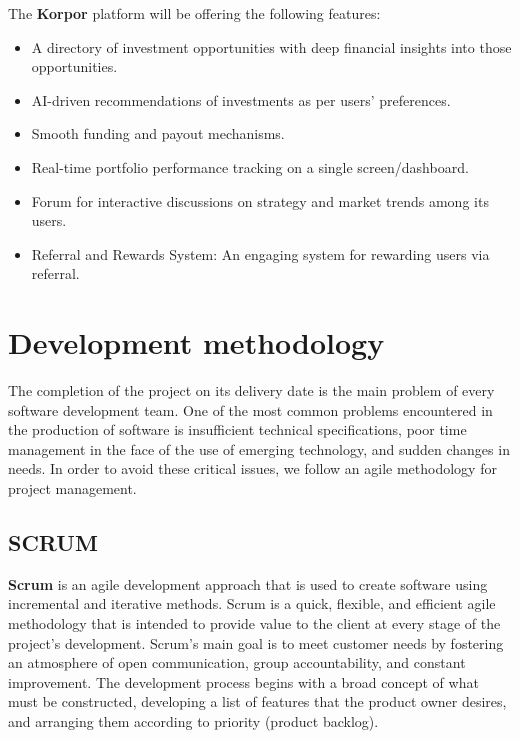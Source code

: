 The \textbf{\textcolor{primary}{Korpor}} platform will be offering the following features:

\begin{itemize}
    \item A directory of investment opportunities with deep financial insights into those opportunities.
    \item AI-driven recommendations of investments as per users' preferences.
    \item Smooth funding and payout mechanisms.
    \item Real-time portfolio performance tracking on a single screen/dashboard.
    \item Forum for interactive discussions on strategy and market trends among its users.
    \item Referral and Rewards System: An engaging system for rewarding users via referral.
\end{itemize}

\section{Development methodology}

The completion of the project on its delivery date is the main problem of every software development team. One of the most common problems encountered in the production of software is insufficient technical specifications, poor time management in the face of the use of emerging technology, and sudden changes in needs. In order to avoid these critical issues, we follow an agile methodology for project management.

\subsection{SCRUM}

\textbf{\textcolor{primary}{Scrum}} is an agile development approach that is used to create software using incremental and iterative methods. Scrum is a quick, flexible, and efficient agile methodology that is intended to provide value to the client at every stage of the project's development. Scrum's main goal is to meet customer needs by fostering an atmosphere of open communication, group accountability, and constant improvement. The development process begins with a broad concept of what must be constructed, developing a list of features that the product owner desires, and arranging them according to priority (product backlog).

